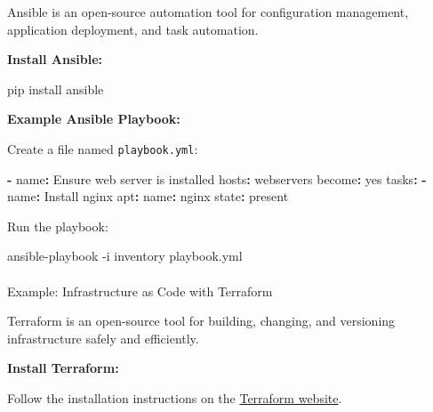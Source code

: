 \documentclass[
  letterpaper,
  DIV=11,
  numbers=noendperiod]{scrreprt}
\makeatletter
\let\oldparagraph\paragraph
\renewcommand{\paragraph}{
    \@ifstar
      \xxxParagraphStar
      \xxxParagraphNoStar
  }
\newcommand{\xxxParagraphStar}[1]{\oldparagraph*{#1}\mbox{}}
\newcommand{\xxxParagraphNoStar}[1]{\oldparagraph{#1}\mbox{}}
\newenvironment{Shaded}{\begin{snugshade}}{\end{snugshade}}
\newcommand{\AttributeTok}[1]{\textcolor[rgb]{0.40,0.45,0.13}{#1}}
\newcommand{\CharTok}[1]{\textcolor[rgb]{0.13,0.47,0.30}{#1}}
\newcommand{\ExtensionTok}[1]{\textcolor[rgb]{0.00,0.23,0.31}{#1}}
\newcommand{\FunctionTok}[1]{\textcolor[rgb]{0.28,0.35,0.67}{#1}}
\newcommand{\KeywordTok}[1]{\textcolor[rgb]{0.00,0.23,0.31}{\textbf{#1}}}
\newcommand{\NormalTok}[1]{\textcolor[rgb]{0.00,0.23,0.31}{#1}}
\makeatother
\begin{document}
Ansible is an open-source automation tool for configuration management,
application deployment, and task automation.

\textbf{Install Ansible:}

\begin{Shaded}
\begin{Highlighting}[]
\ExtensionTok{pip}\NormalTok{ install ansible}
\end{Highlighting}
\end{Shaded}

\textbf{Example Ansible Playbook:}

Create a file named \texttt{playbook.yml}:

\begin{Shaded}
\begin{Highlighting}[]
\KeywordTok{{-}}\AttributeTok{ }\FunctionTok{name}\KeywordTok{:}\AttributeTok{ Ensure web server is installed}
\AttributeTok{  }\FunctionTok{hosts}\KeywordTok{:}\AttributeTok{ webservers}
\AttributeTok{  }\FunctionTok{become}\KeywordTok{:}\AttributeTok{ }\CharTok{yes}
\AttributeTok{  }\FunctionTok{tasks}\KeywordTok{:}
\AttributeTok{    }\KeywordTok{{-}}\AttributeTok{ }\FunctionTok{name}\KeywordTok{:}\AttributeTok{ Install nginx}
\AttributeTok{      }\FunctionTok{apt}\KeywordTok{:}
\AttributeTok{        }\FunctionTok{name}\KeywordTok{:}\AttributeTok{ nginx}
\AttributeTok{        }\FunctionTok{state}\KeywordTok{:}\AttributeTok{ present}
\end{Highlighting}
\end{Shaded}

Run the playbook:

\begin{Shaded}
\begin{Highlighting}[]
\ExtensionTok{ansible{-}playbook} \AttributeTok{{-}i}\NormalTok{ inventory playbook.yml}
\end{Highlighting}
\end{Shaded}

\paragraph{Example: Infrastructure as Code with
Terraform}\label{example-infrastructure-as-code-with-terraform}

Terraform is an open-source tool for building, changing, and versioning
infrastructure safely and efficiently.

\textbf{Install Terraform:}

Follow the installation instructions on the
\href{https://www.terraform.io/downloads}{Terraform website}.
\end{document}
